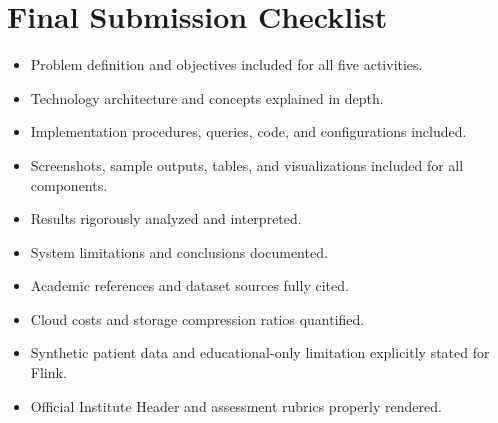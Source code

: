 \documentclass[12pt,a4paper]{report}
\begin{document}
\section*{Final Submission Checklist}
\begin{itemize}
    \item[$\boxtimes$] Problem definition and objectives included for all five activities.
    \item[$\boxtimes$] Technology architecture and concepts explained in depth.
    \item[$\boxtimes$] Implementation procedures, queries, code, and configurations included.
    \item[$\boxtimes$] Screenshots, sample outputs, tables, and visualizations included for all components.
    \item[$\boxtimes$] Results rigorously analyzed and interpreted.
    \item[$\boxtimes$] System limitations and conclusions documented.
    \item[$\boxtimes$] Academic references and dataset sources fully cited.
    \item[$\boxtimes$] Cloud costs and storage compression ratios quantified.
    \item[$\boxtimes$] Synthetic patient data and educational-only limitation explicitly stated for Flink.
    \item[$\boxtimes$] Official Institute Header and assessment rubrics properly rendered.
\end{itemize}
\end{document}
